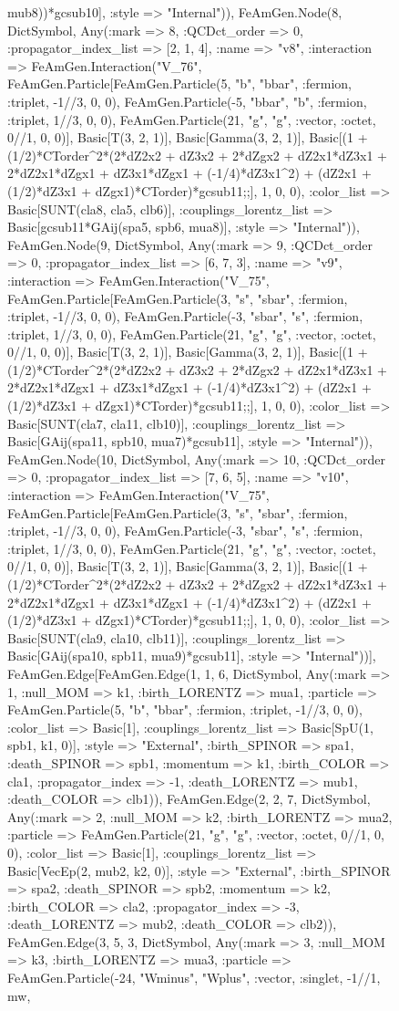 \documentclass{revtex4}
\begin{document}
\begin{figure}[!htb]
\begin{center}
{mub8))*gcsub10], :style => "Internal")), FeAmGen.Node(8, Dict{Symbol, Any}(:mark => 8, :QCDct_order => 0, :propagator_index_list => [2, 1, 4], :name => "v8", :interaction => FeAmGen.Interaction("V_76", FeAmGen.Particle[FeAmGen.Particle(5, "b", "bbar", :fermion, :triplet, -1//3, 0, 0), FeAmGen.Particle(-5, "bbar", "b", :fermion, :triplet, 1//3, 0, 0), FeAmGen.Particle(21, "g", "g", :vector, :octet, 0//1, 0, 0)], Basic[T(3, 2, 1)], Basic[Gamma(3, 2, 1)], Basic[(1 + (1/2)*CTorder^2*(2*dZ2x2 + dZ3x2 + 2*dZgx2 + dZ2x1*dZ3x1 + 2*dZ2x1*dZgx1 + dZ3x1*dZgx1 + (-1/4)*dZ3x1^2) + (dZ2x1 + (1/2)*dZ3x1 + dZgx1)*CTorder)*gcsub11;;], 1, 0, 0), :color_list => Basic[SUNT(cla8, cla5, clb6)], :couplings_lorentz_list => Basic[gcsub11*GAij(spa5, spb6, mua8)], :style => "Internal")), FeAmGen.Node(9, Dict{Symbol, Any}(:mark => 9, :QCDct_order => 0, :propagator_index_list => [6, 7, 3], :name => "v9", :interaction => FeAmGen.Interaction("V_75", FeAmGen.Particle[FeAmGen.Particle(3, "s", "sbar", :fermion, :triplet, -1//3, 0, 0), FeAmGen.Particle(-3, "sbar", "s", :fermion, :triplet, 1//3, 0, 0), FeAmGen.Particle(21, "g", "g", :vector, :octet, 0//1, 0, 0)], Basic[T(3, 2, 1)], Basic[Gamma(3, 2, 1)], Basic[(1 + (1/2)*CTorder^2*(2*dZ2x2 + dZ3x2 + 2*dZgx2 + dZ2x1*dZ3x1 + 2*dZ2x1*dZgx1 + dZ3x1*dZgx1 + (-1/4)*dZ3x1^2) + (dZ2x1 + (1/2)*dZ3x1 + dZgx1)*CTorder)*gcsub11;;], 1, 0, 0), :color_list => Basic[SUNT(cla7, cla11, clb10)], :couplings_lorentz_list => Basic[GAij(spa11, spb10, mua7)*gcsub11], :style => "Internal")), FeAmGen.Node(10, Dict{Symbol, Any}(:mark => 10, :QCDct_order => 0, :propagator_index_list => [7, 6, 5], :name => "v10", :interaction => FeAmGen.Interaction("V_75", FeAmGen.Particle[FeAmGen.Particle(3, "s", "sbar", :fermion, :triplet, -1//3, 0, 0), FeAmGen.Particle(-3, "sbar", "s", :fermion, :triplet, 1//3, 0, 0), FeAmGen.Particle(21, "g", "g", :vector, :octet, 0//1, 0, 0)], Basic[T(3, 2, 1)], Basic[Gamma(3, 2, 1)], Basic[(1 + (1/2)*CTorder^2*(2*dZ2x2 + dZ3x2 + 2*dZgx2 + dZ2x1*dZ3x1 + 2*dZ2x1*dZgx1 + dZ3x1*dZgx1 + (-1/4)*dZ3x1^2) + (dZ2x1 + (1/2)*dZ3x1 + dZgx1)*CTorder)*gcsub11;;], 1, 0, 0), :color_list => Basic[SUNT(cla9, cla10, clb11)], :couplings_lorentz_list => Basic[GAij(spa10, spb11, mua9)*gcsub11], :style => "Internal"))], FeAmGen.Edge[FeAmGen.Edge(1, 1, 6, Dict{Symbol, Any}(:mark => 1, :null_MOM => k1, :birth_LORENTZ => mua1, :particle => FeAmGen.Particle(5, "b", "bbar", :fermion, :triplet, -1//3, 0, 0), :color_list => Basic[1], :couplings_lorentz_list => Basic[SpU(1, spb1, k1, 0)], :style => "External", :birth_SPINOR => spa1, :death_SPINOR => spb1, :momentum => k1, :birth_COLOR => cla1, :propagator_index => -1, :death_LORENTZ => mub1, :death_COLOR => clb1)), FeAmGen.Edge(2, 2, 7, Dict{Symbol, Any}(:mark => 2, :null_MOM => k2, :birth_LORENTZ => mua2, :particle => FeAmGen.Particle(21, "g", "g", :vector, :octet, 0//1, 0, 0), :color_list => Basic[1], :couplings_lorentz_list => Basic[VecEp(2, mub2, k2, 0)], :style => "External", :birth_SPINOR => spa2, :death_SPINOR => spb2, :momentum => k2, :birth_COLOR => cla2, :propagator_index => -3, :death_LORENTZ => mub2, :death_COLOR => clb2)), FeAmGen.Edge(3, 5, 3, Dict{Symbol, Any}(:mark => 3, :null_MOM => k3, :birth_LORENTZ => mua3, :particle => FeAmGen.Particle(-24, "Wminus", "Wplus", :vector, :singlet, -1//1, mw, }
\end{center}
\end{figure}
\end{document}
